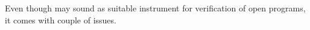 %
%
%
%
%
%
%
%
%
%
%
%
%

Even though \SymDIVINE may sound as suitable instrument for verification of open
programs, it comes with couple of issues.

